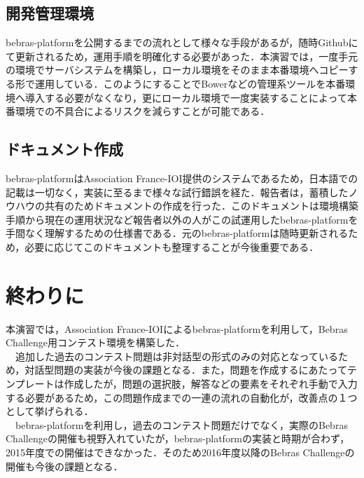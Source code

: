 \documentclass[a4paper]{jarticle}
\begin{document}
\begin{multicols}{2}
\subsection{開発管理環境}
bebras-platformを公開するまでの流れとして様々な手段があるが，随時Githubにて更新されるため，運用手順を明確化する必要があった．本演習では，一度手元の環境でサーバシステムを構築し，ローカル環境をそのまま本番環境へコピーする形で運用している．このようにすることでBowerなどの管理系ツールを本番環境へ導入する必要がなくなり，更にローカル環境で一度実装することによって本番環境での不具合によるリスクを減らすことが可能である．

\subsection{ドキュメント作成}
bebras-platformはAssociation France-IOI提供のシステムであるため，日本語での記載は一切なく，実装に至るまで様々な試行錯誤を経た．報告者は，蓄積したノウハウの共有のためドキュメントの作成を行った．このドキュメントは環境構築手順から現在の運用状況など報告者以外の人がこの試運用したbebras-platformを手間なく理解するための仕様書である．元のbebras-platformは随時更新されるため，必要に応じてこのドキュメントも整理することが今後重要である．

\section{終わりに}
本演習では，Association France-IOIによるbebras-platformを利用して，Bebras Challenge用コンテスト環境を構築した．
\\　追加した過去のコンテスト問題は非対話型の形式のみの対応となっているため，対話型問題の実装が今後の課題となる．また，問題を作成するにあたってテンプレートは作成したが，問題の選択肢，解答などの要素をそれぞれ手動で入力する必要があるため，この問題作成までの一連の流れの自動化が，改善点の１つとして挙げられる．
\\　bebras-platformを利用し，過去のコンテスト問題だけでなく，実際のBebras Challengeの開催も視野入れていたが，bebras-platformの実装と時期が合わず，2015年度での開催はできなかった．そのため2016年度以降のBebras Challengeの開催も今後の課題となる．

\end{multicols}
\end{document}
